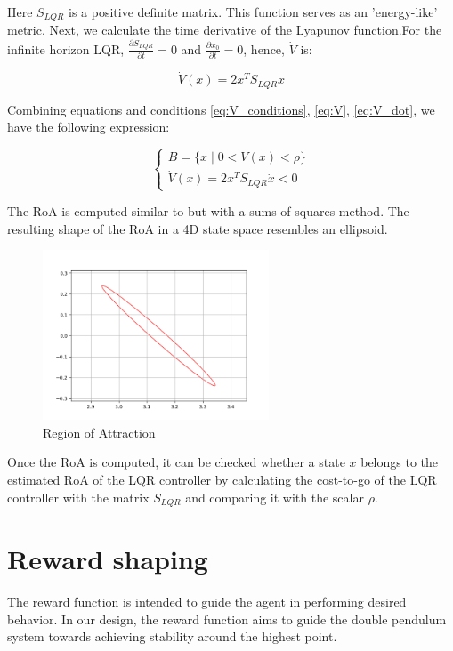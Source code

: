 Here \(S_{LQR}\) is a positive definite matrix. This function serves as an 'energy-like' metric. Next, we calculate the time derivative of the Lyapunov function.For the infinite horizon LQR, \(\frac{\partial S_{LQR}}{\partial t} = 0\) and \(\frac{\partial x_0}{\partial t} = 0\), hence, \(\dot{V}\) is:

\begin{equation}
\dot{V}(x) = 2x^{T}S_{LQR}\dot{x}
\label{eq:V_dot}
\end{equation}

Combining equations and conditions \ref{eq:V_conditions}, \ref{eq:V}, \ref{eq:V_dot}, we have the following expression:

\begin{equation}
\begin{cases}
    B = \{ x \mid 0 < V(x) < \rho \} \\
    \dot{V}(x) = 2x^T S_{LQR} \dot{x} < 0
\end{cases}
\end{equation}

The RoA is computed similar to\cite{maywald2022co} but with a sums of squares method\cite{tedrake2010lqr}. The resulting shape of the RoA in a 4D state space resembles an ellipsoid.

\begin{figure}[htbp]
    \centering
    \includegraphics[width=0.6\textwidth]{figures/methodology/roaplot.png} %
    \caption{Region of Attraction}
    \label{fig:example}
\end{figure}

Once the RoA is computed, it can be checked whether a state \(x\) belongs to the estimated RoA of the LQR controller by calculating the cost-to-go of the LQR controller with the matrix \(S_{LQR}\) and comparing it with the scalar \(\rho\).

\section{Reward shaping}
The reward function is intended to guide the agent in performing desired behavior. In our design, the reward function aims to guide the double pendulum system towards achieving stability around the highest point.

